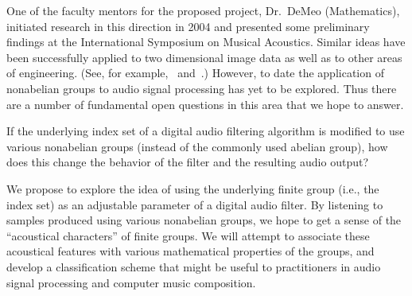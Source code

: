 \documentclass[10pt]{article}
\begin{document}
One of the faculty mentors for the proposed project, Dr.~DeMeo
(Mathematics), initiated research in this direction in 2004 and presented some
preliminary findings at the International Symposium on Musical Acoustics.
Similar ideas have been successfully applied to two dimensional image data
as well as to other areas of
engineering. (See, for example,~\cite{Chirikjian:2002}
and~\cite{Tolimieri:2003}.)  However, to date the application of
nonabelian groups to audio signal processing has yet to be explored. Thus
there are a number of fundamental open questions in this area that we hope to
answer.  
 
\vskip5mm

If the underlying index set of a digital audio filtering algorithm is modified
to use various nonabelian groups (instead of the commonly used abelian group),
how does this change the behavior of the filter and the resulting audio output?

\vskip5mm

We propose to explore the idea of using the underlying finite group (i.e., the
index set) as an adjustable parameter of a digital audio filter.  By listening to
samples produced using various nonabelian groups, we hope to get a sense of the
``acoustical characters'' of finite groups.  We will attempt to associate these
acoustical features with various mathematical properties of the groups, and
develop a classification scheme that might be useful to
practitioners in audio signal processing and computer music composition.
\end{document}
